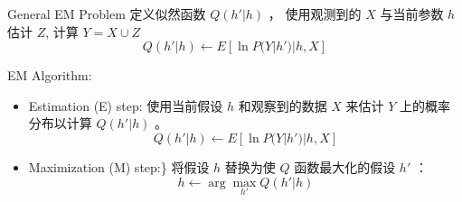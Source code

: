 \documentclass[presentation]{beamer}
\begin{document}
\begin{frame}[label={sec:orgbbf8ed8}]{General  EM Problem}
定义似然函数 \(Q(h' | h)\) ， 使用观测到的 \(X\) 与当前参数 \(h\) 估计 \(Z\), 计算 \(Y = X \cup Z\)
$$Q(h' | h) \leftarrow E[ \ln P(Y | h') | h, X ]$$

EM Algorithm:

\begin{itemize}
\item Estimation (E) step: 
使用当前假设 \(h\) 和观察到的数据 \(X\) 来估计 \(Y\) 上的概率分布以计算 \(Q(h'|h)\) 。
$$Q(h' | h) \leftarrow E[ \ln P(Y | h') | h, X ]$$
\item Maximization (M) step:\} 
将假设 \(h\) 替换为使 \(Q\) 函数最大化的假设 \(h'\) ：
$$h \leftarrow \arg \max_{h'}  Q(h' | h)$$
\end{itemize}
\end{frame}
\end{document}

